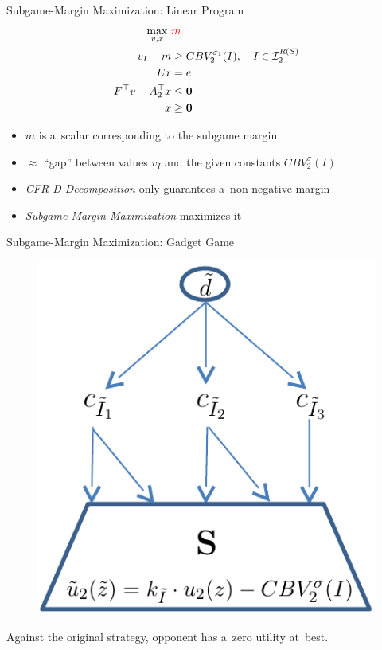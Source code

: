 \documentclass{beamer}
\theoremstyle{definition}
\newcommand{\vect}[1]{\boldsymbol{#1}}
\newcommand{\I}{\mathcal{I}}
\begin{document}
  \begin{frame}{Subgame-Margin Maximization: Linear Program}
    \begin{equation*}
      \label{lp:max-margin}
      \begin{split}
        \max_{v, x}\ &\textcolor{red}{m} \\
        v_I - m &\ge CBV_2^{\sigma_1}(I), \quad I \in \I_2^{R(S)}\\ 
        Ex &= e \\
        F^\top v - A_2^\top x &\le \vect{0} \\
        x &\ge \vect{0}
      \end{split}
    \end{equation*}
    \pause

    \begin{itemize}[<+- | alert@+>]
      \item $m$ is a~scalar corresponding to the subgame margin
      \item $\approx$ ``gap'' between values $v_I$ and the given constants $CBV_2^\sigma(I)$
      \item \emph{CFR-D Decomposition} only guarantees a~non-negative margin
      \item \emph{Subgame-Margin Maximization} maximizes it
    \end{itemize}
  \end{frame}

  \begin{frame}{Subgame-Margin Maximization: Gadget Game}
    \begin{figure}
      \centering
      \includegraphics[width=.5\textwidth]{../img/max-margin-gadget.png}
    \end{figure}
    \pause

    Against the original strategy, opponent has a~zero utility at~best.
  \end{frame}
\end{document}
